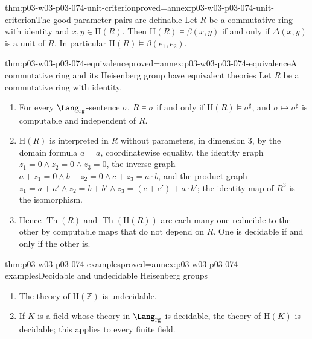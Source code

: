 \begin{hblemma}{thm:p03-w03-p03-074-unit-criterion}{proved=annex:p03-w03-p03-074-unit-criterion}{The good parameter pairs are definable}
Let \(R\) be a commutative ring with identity and
\(x,y\in\mathrm H(R)\). Then \(\mathrm H(R)\models\beta(x,y)\) if and
only if \(\Delta(x,y)\) is a unit of \(R\). In particular
\(\mathrm H(R)\models\beta(e_1,e_2)\).
\end{hblemma}

\begin{hbtheorem}{thm:p03-w03-p03-074-equivalence}{proved=annex:p03-w03-p03-074-equivalence}{A commutative ring and its Heisenberg group have equivalent theories}
Let \(R\) be a commutative ring with identity.
\begin{enumerate}
  \item For every \(\Lang_{\mathrm{rg}}\)-sentence \(\sigma\),
        \(R\models\sigma\) if and only if
        \(\mathrm H(R)\models\sigma^{\sharp}\), and \(\sigma\mapsto\sigma^{\sharp}\)
        is computable and independent of \(R\).
  \item \(\mathrm H(R)\) is interpreted in \(R\) without parameters, in
        dimension \(3\), by the domain formula \(a=a\), coordinatewise
        equality, the identity graph
        \(z_1=0\land z_2=0\land z_3=0\), the inverse graph
        \(a+z_1=0\land b+z_2=0\land c+z_3=a\cdot b\), and the product
        graph \(z_1=a+a'\land z_2=b+b'\land z_3=(c+c')+a\cdot b'\);
        the identity map of \(R^3\) is the isomorphism.
  \item Hence \(\operatorname{Th}(R)\) and \(\operatorname{Th}(\mathrm H(R))\)
        are each many-one reducible to the other by computable maps that do
        not depend on \(R\). One is decidable if and only if the other is.
\end{enumerate}
\end{hbtheorem}

\begin{hbcorollary}{thm:p03-w03-p03-074-examples}{proved=annex:p03-w03-p03-074-examples}{Decidable and undecidable Heisenberg groups}
\begin{enumerate}
  \item The theory of \(\mathrm H(\mathbb Z)\) is undecidable.
  \item If \(K\) is a field whose theory in \(\Lang_{\mathrm{rg}}\) is
        decidable, the theory of \(\mathrm H(K)\) is decidable; this
        applies to every finite field.
\end{enumerate}
\end{hbcorollary}


